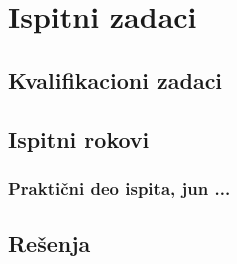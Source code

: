 \appendix
\chapter{Ispitni zadaci}



\section{Kvalifikacioni zadaci}

\section{Ispitni rokovi}

\subsection{Praktični deo ispita, jun ...}

\section{Rešenja}
\shipoutAnswer
